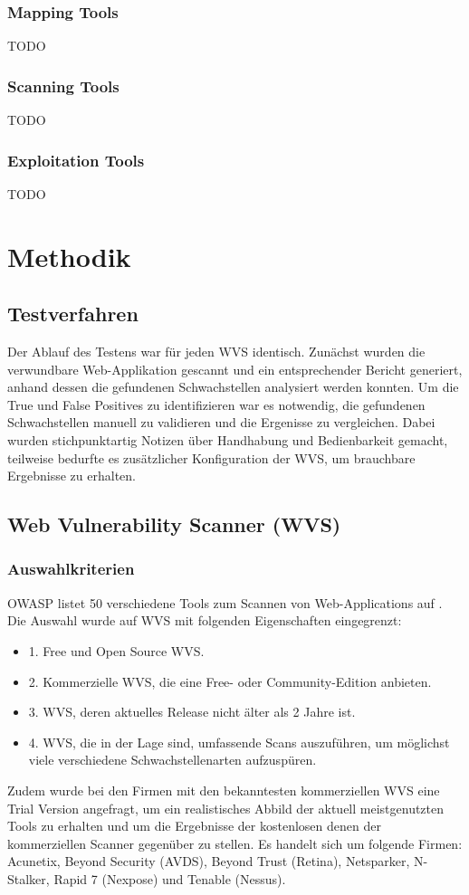 \documentclass[12pt,oneside,a4paper,parskip]{scrbook}
\begin{document}
    \subsection{Mapping Tools}
    TODO
    \subsection{Scanning Tools}
    TODO
    \subsection{Exploitation Tools}
    TODO

\chapter{Methodik}
\section{Testverfahren}
Der Ablauf des Testens war für jeden WVS identisch.
Zunächst wurden die verwundbare Web-Applikation gescannt und ein entsprechender Bericht generiert, anhand dessen die gefundenen Schwachstellen analysiert werden konnten. Um die True und False Positives zu identifizieren war es notwendig, die gefundenen Schwachstellen manuell zu validieren und die Ergenisse zu vergleichen.
Dabei wurden stichpunktartig Notizen über Handhabung und Bedienbarkeit gemacht, teilweise bedurfte es zusätzlicher Konfiguration der WVS, um brauchbare Ergebnisse zu erhalten.

\section{Web Vulnerability Scanner (WVS)}
  \subsection{Auswahlkriterien}
  OWASP listet 50 verschiedene Tools zum Scannen von Web-Applications auf
  \cite{OWASPtools}. Die Auswahl wurde auf WVS mit folgenden Eigenschaften eingegrenzt:
  \begin{itemize}
    \item 1. Free und Open Source WVS.
    \item 2. Kommerzielle WVS, die eine Free- oder Community-Edition anbieten.
    \item 3. WVS, deren aktuelles Release nicht älter als 2 Jahre ist.
    \item 4. WVS, die in der Lage sind, umfassende Scans auszuführen, um möglichst viele verschiedene Schwachstellenarten aufzuspüren.
  \end{itemize}
  Zudem wurde bei den Firmen mit den bekanntesten kommerziellen WVS eine Trial Version angefragt, um ein realistisches Abbild der aktuell meistgenutzten Tools zu erhalten und um die Ergebnisse der kostenlosen denen der kommerziellen Scanner gegenüber zu stellen. Es handelt sich um folgende Firmen:
  \\Acunetix, Beyond Security (AVDS), Beyond Trust (Retina), Netsparker, N-Stalker, Rapid 7 (Nexpose) und Tenable (Nessus).
\end{document}
